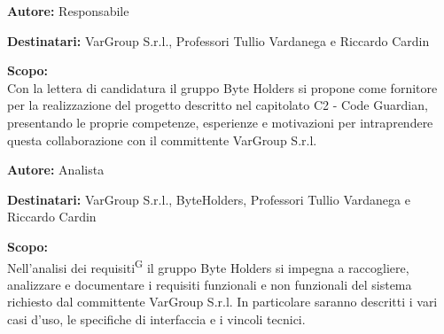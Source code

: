 \documentclass[a4paper, 11pt]{article}
\begin{document}


\begin{tcolorbox}[
    colback=LightGray,       %
    colframe=AccentColor,    %
    coltitle=white,          %
    fonttitle=\bfseries\large,
    boxrule=0.5mm,           %
    arc=2mm,                 %
    title={Lettera di Candidatura} %
]
    \textbf{\textcolor{AccentDark}{Autore:}} Responsabile  %
    
    \vspace{0.2cm} %
    \textbf{\textcolor{AccentDark}{Destinatari:}} VarGroup S.r.l., Professori Tullio Vardanega e Riccardo Cardin

    \vspace{0.2cm} %

    \textbf{\textcolor{AccentDark}{Scopo:}} \\
    Con la lettera di candidatura il gruppo Byte Holders si propone come fornitore per la realizzazione del progetto descritto nel capitolato C2 - Code Guardian, presentando le proprie competenze, esperienze e motivazioni per intraprendere questa collaborazione con il committente VarGroup S.r.l.
\end{tcolorbox}

\begin{tcolorbox}[
    colback=LightGray,       %
    colframe=AccentColor,    %
    coltitle=white,          %
    fonttitle=\bfseries\large,
    boxrule=0.5mm,           %
    arc=2mm,                 %
    title={Analisi Dei Requisiti\textsuperscript{G}} %
]
    \textbf{\textcolor{AccentDark}{Autore:}} Analista  %
    
    \vspace{0.2cm} %
    \textbf{\textcolor{AccentDark}{Destinatari:}} VarGroup S.r.l., ByteHolders, Professori Tullio Vardanega e Riccardo Cardin

    \vspace{0.2cm} %

    \textbf{\textcolor{AccentDark}{Scopo:}} \\
    Nell'analisi dei requisiti\textsuperscript{G} il gruppo Byte Holders si impegna a raccogliere, analizzare e documentare i requisiti funzionali e non funzionali del sistema richiesto dal committente VarGroup S.r.l.
    In particolare saranno descritti i vari casi d'uso, le specifiche di interfaccia e i vincoli tecnici.
\end{tcolorbox}
\end{document}
